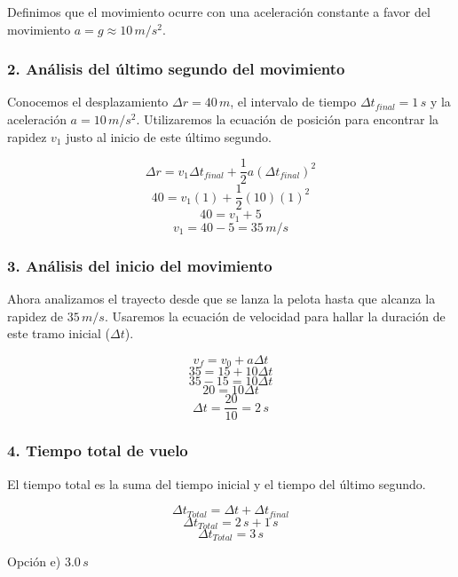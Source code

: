 \documentclass[12pt, a4paper]{article}
\begin{document}
Definimos que el movimiento ocurre con una aceleración constante a favor del movimiento $a = g \approx 10 \, \si{m/s^2}$.

\subsubsection*{2. Análisis del último segundo del movimiento}
Conocemos el desplazamiento $\Delta r = 40 \, \si{m}$, el intervalo de tiempo $\Delta t_{final} = 1 \, \si{s}$ y la aceleración $a = 10 \, \si{m/s^2}$. Utilizaremos la ecuación de posición para encontrar la rapidez $v_1$ justo al inicio de este último segundo.

$$\Delta r = v_1 \Delta t_{final} + \frac{1}{2} a (\Delta t_{final})^2$$
$$40 = v_1 (1) + \frac{1}{2} (10) (1)^2$$
$$40 = v_1 + 5$$
$$v_1 = 40 - 5 = 35 \, \si{m/s}$$

\subsubsection*{3. Análisis del inicio del movimiento}
Ahora analizamos el trayecto desde que se lanza la pelota hasta que alcanza la rapidez de $35 \, \si{m/s}$. Usaremos la ecuación de velocidad para hallar la duración de este tramo inicial ($\Delta t$).

$$v_f = v_0 + a \Delta t$$
$$35 = 15 + 10 \Delta t$$
$$35 - 15 = 10 \Delta t$$
$$20 = 10 \Delta t$$
$$\Delta t = \frac{20}{10} = 2 \, \si{s}$$

\subsubsection*{4. Tiempo total de vuelo}
El tiempo total es la suma del tiempo inicial y el tiempo del último segundo.

$$\Delta t_{Total} = \Delta t + \Delta t_{final}$$
$$\Delta t_{Total} = 2 \, \si{s} + 1 \, \si{s}$$
$$\Delta t_{Total} = 3 \, \si{s}$$

\begin{tcolorbox}[colback=green!5!white, colframe=green!50!black, title=Respuesta Final]
\centering Opción e) $3.0 \, \si{s}$
\end{tcolorbox}

\newpage
\end{document}
